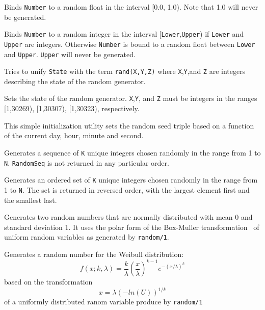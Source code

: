 
\begin{description}

 
%
Binds \texttt{Number} to a random float in the interval [0.0, 1.0).
Note that 1.0 will never be generated.

 
    Binds \texttt{Number} to a random integer in the interval
    [\texttt{Lower},\texttt{Upper}) if \texttt{Lower} and \texttt{Upper}
    are integers.  Otherwise \texttt{Number} is bound to a random float
    between \texttt{Lower} and \texttt{Upper}.  \texttt{Upper} will
    never be generated.

 
    Tries to unify \texttt{State} with the term \texttt{rand(X,Y,Z)}
    where \texttt{X},\texttt{Y},and \texttt{Z} are integers describing
    the state of the random generator.

 
    Sets the state of the random generator.  \texttt{X},\texttt{Y}, and
    \texttt{Z} must be integers in the ranges [1,30269), [1,30307),
    [1,30323), respectively.

 
This simple initialization utility sets the random seed triple based on a
function of the current day, hour, minute and second. 

 
    Generates a sequence of \texttt{K} unique integers chosen randomly
    in the range from 1 to \texttt{N}.  \texttt{RandomSeq} is not
    returned in any particular order.

 
    Generates an ordered set of \texttt{K} unique integers chosen
    randomly in the range from 1 to \texttt{N}.  The set is returned in
    reversed order, with the largest element first and the smallest
    last.

 
%
Generates two random numbers that are normally distributed with mean 0
and standard deviation 1.  It uses the polar form of the Box-Muller
transformation~\cite{BoxM58} of uniform random variables as generated by
{\tt random/1}.

 
%
Generates a random number for the Weibull distribution:
\[
  f(x;k,\lambda) = \frac{k}{\lambda}(\frac{x}{\lambda})^{k-1}e^{-(x/\lambda)^h}
\]
based on the transformation
\[
  x = \lambda(-ln(U))^{1/k}
\]
of a uniformly distributed ranom variable produce by {\tt random/1}


\end{description}
